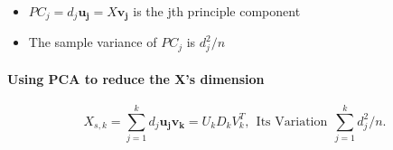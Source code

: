 \documentclass[]{article}
\providecommand{\tightlist}{%
  \setlength{\itemsep}{0pt}\setlength{\parskip}{0pt}}
\let\oldparagraph\paragraph
\renewcommand{\paragraph}[1]{\oldparagraph{#1}\mbox{}}
\begin{document}
\begin{itemize}
\tightlist
\item
  \(PC_j = d_j\pmb{u_j} = X\pmb{v_j}\) is the jth principle component
\item
  The sample variance of \(PC_j\) is \(d_j^2/n\)
\end{itemize}

\paragraph{Using PCA to reduce the X's
dimension}\label{using-pca-to-reduce-the-xs-dimension}

\[
  X_{s,k} = \sum_{j=1}^{k}d_j\pmb{u_jv_k} = U_kD_kV_k^T,~~ \text{Its Variation} ~~  \sum_{j=1}^kd_j^2/n.
\]
\end{document}
